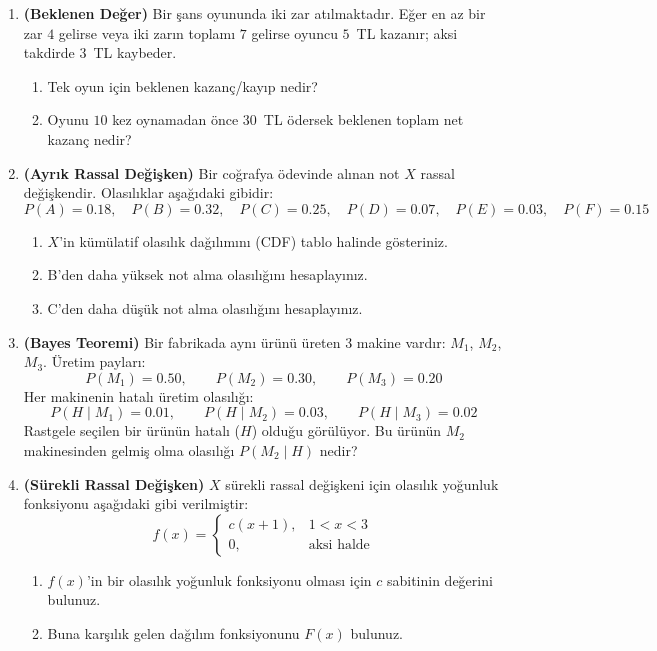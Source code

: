 \documentclass[12pt,a4paper]{article}
\begin{document}
\begin{enumerate}



\item \textbf{(Beklenen Değer)} Bir şans oyununda iki zar atılmaktadır. Eğer en az bir zar $4$ gelirse veya iki zarın toplamı $7$ gelirse oyuncu $5$~TL kazanır; aksi takdirde $3$~TL kaybeder.
\begin{enumerate}
\item Tek oyun için beklenen kazanç/kayıp nedir?
\item Oyunu $10$ kez oynamadan önce $30$~TL ödersek beklenen toplam net kazanç nedir?
\end{enumerate}

\vspace{0.5cm}

\item \textbf{(Ayrık Rassal Değişken)} Bir coğrafya ödevinde alınan not $X$ rassal değişkendir. Olasılıklar aşağıdaki gibidir:
\[
P(A)=0.18,\quad 
P(B)=0.32,\quad 
P(C)=0.25,\quad 
P(D)=0.07,\quad 
P(E)=0.03,\quad 
P(F)=0.15
\]
\begin{enumerate}
\item $X$'in kümülatif olasılık dağılımını (CDF) tablo halinde gösteriniz.
\item B'den daha yüksek not alma olasılığını hesaplayınız.
\item C'den daha düşük not alma olasılığını hesaplayınız.
\end{enumerate}

\vspace{0.5cm}

\item \textbf{(Bayes Teoremi)} Bir fabrikada aynı ürünü üreten 3 makine vardır: $M_1$, $M_2$, $M_3$. Üretim payları:
\[
P(M_1)=0.50,\qquad
P(M_2)=0.30,\qquad
P(M_3)=0.20
\]
Her makinenin hatalı üretim olasılığı:
\[
P(H\mid M_1)=0.01,\qquad
P(H\mid M_2)=0.03,\qquad
P(H\mid M_3)=0.02
\]
Rastgele seçilen bir ürünün hatalı ($H$) olduğu görülüyor. Bu ürünün $M_2$ makinesinden gelmiş olma olasılığı $P(M_2\mid H)$ nedir?

\newpage

\item \textbf{(Sürekli Rassal Değişken)} $X$ sürekli rassal değişkeni için olasılık yoğunluk fonksiyonu aşağıdaki gibi verilmiştir:
\[
f(x)=
\begin{cases}
c(x+1), & 1<x<3 \\
0, & \text{aksi halde}
\end{cases}
\]
\begin{enumerate}
\item $f(x)$'in bir olasılık yoğunluk fonksiyonu olması için $c$ sabitinin değerini bulunuz.
\item Buna karşılık gelen dağılım fonksiyonunu $F(x)$ bulunuz.
\end{enumerate}


\end{enumerate}
\end{document}
